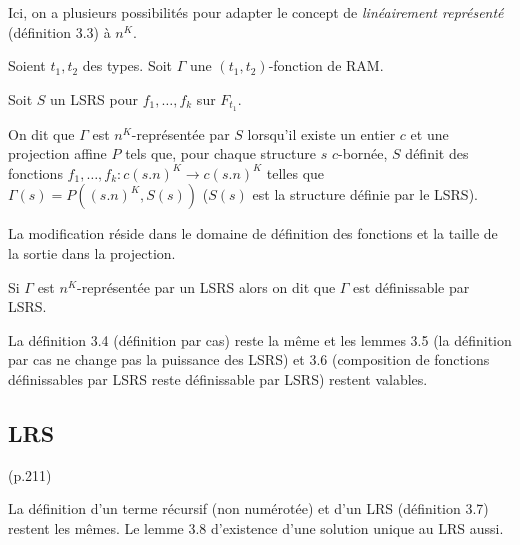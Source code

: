 \documentclass{report}
\newcommand{\dtimeram}{\text{DTIME}_{\text{RAM}}\left( n^H \right)}
\begin{document}
		
		Ici, on a plusieurs possibilités pour adapter le concept de \emph{linéairement représenté} (définition 3.3) à $n^K$.
		
		\begin{definition}
			\label{def:representee_par_LSRS}
			Soient $t_1, t_2$ des types. Soit $\Gamma$ une $(t_1, t_2)$-fonction de RAM.
			
			
			Soit $S$ un LSRS pour $f_1, \dots, f_k$ sur $F_{t_1}$. 
			
			On dit que $\Gamma$ est $n^K$-représentée par $S$ lorsqu'il existe un entier $c$ et une projection affine $P$ tels que, pour chaque structure $s$ $c$-bornée, $S$ définit des fonctions $f_1, \dots, f_k : c (s.n)^K \to c (s.n)^K$ telles que $\Gamma(s) = P((s.n)^K, S(s))$ ($S(s)$ est la structure définie par le LSRS).
			

		\end{definition}
		
		La modification réside dans le domaine de définition des fonctions et la taille de la sortie dans la projection.
		
%		
			
	
		Si $\Gamma$ est $n^K$-représentée par un LSRS alors on dit que $\Gamma$ est définissable par LSRS. 
		
		
		
		La définition 3.4 (définition par cas) reste la même et les lemmes 3.5 (la définition par cas ne change pas la puissance des LSRS) et 3.6 (composition de fonctions définissables par LSRS reste définissable par LSRS) restent valables.
		
		
		\subsection{LRS} (p.211)
			\label{subsec:LRS}
		
		
		La définition d'un terme récursif (non numérotée) et d'un LRS (définition 3.7) restent les mêmes. Le lemme 3.8 d'existence d'une solution unique au LRS aussi. 
		
\end{document}
